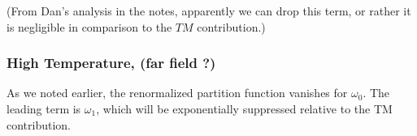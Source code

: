 (From Dan's analysis in the notes, apparently we can drop this term, or rather it is negligible in comparison to the $TM$ contribution.)


\subsubsection{High Temperature, (far field ?)}  

As we noted earlier, the renormalized partition function vanishes for $\omega_0$.
  The leading term is $\omega_1$, which will be exponentially suppressed relative to the TM contribution.  









